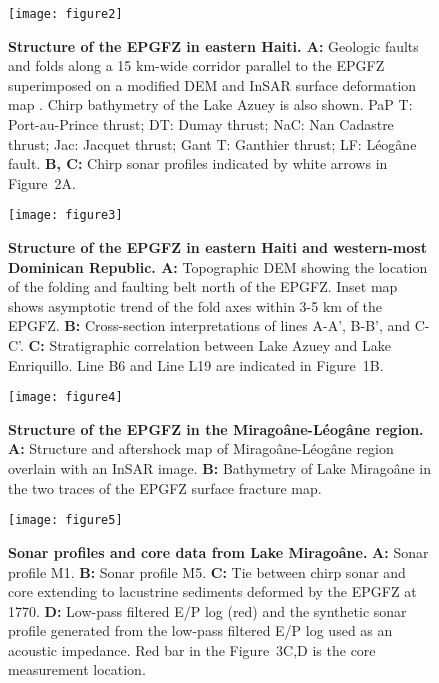 \documentclass[man,natbib]{apa6}
\begin{document}
\begin{figure}
\centering
\texttt{[image: figure2]}
\caption{\textbf{Structure of the EPGFZ in eastern Haiti. A:} Geologic faults and folds along a 15 km-wide corridor parallel to the EPGFZ superimposed on a modified DEM and InSAR surface deformation map \citep{hayes2010complex,hashimoto2011fan}. Chirp bathymetry of the Lake Azuey is also shown. PaP T: Port-au-Prince thrust; DT: Dumay thrust; NaC: Nan Cadastre thrust; Jac: Jacquet thrust; Gant T: Ganthier thrust; LF: L\'eog\^ane fault. \textbf{B, C:} Chirp sonar profiles indicated by white arrows in Figure~2A.}
\label{figure2}
\end{figure}

\begin{figure}
\centering
\texttt{[image: figure3]}
\caption{\textbf{Structure of the EPGFZ in eastern Haiti and western-most Dominican Republic. A:} Topographic DEM showing the location of the folding and faulting belt north of the EPGFZ. Inset map shows asymptotic trend of the fold axes within 3-5 km of the EPGFZ. \textbf{B:} Cross-section interpretations of lines A-A', B-B', and C-C'. \textbf{C:} Stratigraphic correlation between Lake Azuey and Lake Enriquillo. Line B6 and Line L19 are indicated in Figure~1B.}
\label{figure3}
\end{figure}

\begin{figure}
\centering
\texttt{[image: figure4]}
\caption{\textbf{Structure of the EPGFZ in the Mirago\^ane-L\'eog\^ane region. A:} Structure \citep{prentice2010seismic} and aftershock \citep{douilly2015three} map of Mirago\^ane-L\'eog\^ane region overlain with an InSAR image. \textbf{B:} Bathymetry of Lake Mirago\^ane in the two traces of the EPGFZ surface fracture map.}
\label{figure4}
\end{figure}

\begin{figure}
\centering
\texttt{[image: figure5]}
\caption{\textbf{Sonar profiles and core data from Lake Mirago\^ane.} \textbf{A:} Sonar profile M1. \textbf{B:} Sonar profile M5. \textbf{C:} Tie between chirp sonar and core \citep{higuera199910} extending to lacustrine sediments deformed by the EPGFZ at 1770. \textbf{D:} Low-pass filtered E/P log (red) and the synthetic sonar profile generated from the low-pass filtered E/P log used as an acoustic impedance. Red bar in the Figure~3C,D is the core measurement \citep{higuera199910} location.}
\label{figure5}
\end{figure}
\end{document}

